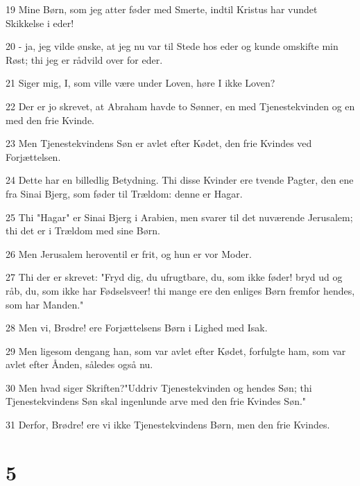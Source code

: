 \par 19 Mine Børn, som jeg atter føder med Smerte, indtil Kristus har vundet Skikkelse i eder!
\par 20 - ja, jeg vilde ønske, at jeg nu var til Stede hos eder og kunde omskifte min Røst; thi jeg er rådvild over for eder.
\par 21 Siger mig, I, som ville være under Loven, høre I ikke Loven?
\par 22 Der er jo skrevet, at Abraham havde to Sønner, en med Tjenestekvinden og en med den frie Kvinde.
\par 23 Men Tjenestekvindens Søn er avlet efter Kødet, den frie Kvindes ved Forjættelsen.
\par 24 Dette har en billedlig Betydning. Thi disse Kvinder ere tvende Pagter, den ene fra Sinai Bjerg, som føder til Trældom: denne er Hagar.
\par 25 Thi "Hagar" er Sinai Bjerg i Arabien, men svarer til det nuværende Jerusalem; thi det er i Trældom med sine Børn.
\par 26 Men Jerusalem heroventil er frit, og hun er vor Moder.
\par 27 Thi der er skrevet: "Fryd dig, du ufrugtbare, du, som ikke føder! bryd ud og råb, du, som ikke har Fødselsveer! thi mange ere den enliges Børn fremfor hendes, som har Manden."
\par 28 Men vi, Brødre! ere Forjættelsens Børn i Lighed med Isak.
\par 29 Men ligesom dengang han, som var avlet efter Kødet, forfulgte ham, som var avlet efter Ånden, således også nu.
\par 30 Men hvad siger Skriften?"Uddriv Tjenestekvinden og hendes Søn; thi Tjenestekvindens Søn skal ingenlunde arve med den frie Kvindes Søn."
\par 31 Derfor, Brødre! ere vi ikke Tjenestekvindens Børn, men den frie Kvindes.

\chapter{5}

